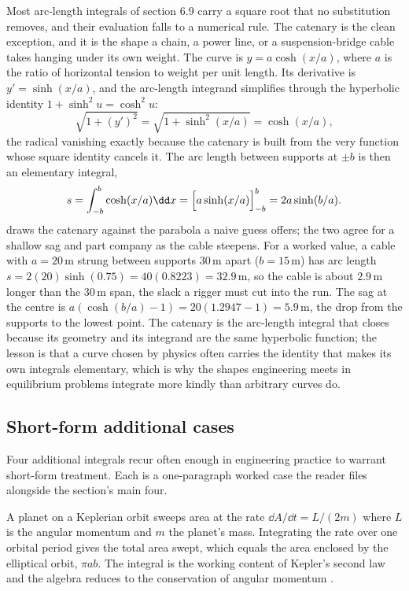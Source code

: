 Most arc-length integrals of section 6.9 carry a square root that no
substitution removes, and their evaluation falls to a numerical rule. The
catenary is the clean exception, and it is the shape a chain, a power
line, or a suspension-bridge cable takes hanging under its own weight. The
curve is $y = a\cosh(x/a)$, where $a$ is the ratio of horizontal tension
to weight per unit length. Its derivative is $y' = \sinh(x/a)$, and the
arc-length integrand simplifies through the hyperbolic identity $1 +
\sinh^{2}u = \cosh^{2}u$:
\[
\sqrt{1 + (y')^{2}} = \sqrt{1 + \sinh^{2}(x/a)} = \cosh(x/a),
\]
the radical vanishing exactly because the catenary is built from the very
function whose square identity cancels it. The arc length between supports
at $\pm b$ is then an elementary integral,
\[
s = \int_{-b}^{b}\cosh(x/a)\dd x = \Bigl[a\sinh(x/a)\Bigr]_{-b}^{b} =
2a\sinh(b/a).
\]
 draws the catenary against the
parabola a naive guess offers; the two agree for a shallow sag and part
company as the cable steepens. For a worked value, a cable with $a =
20\,\si{\meter}$ strung between supports $30\,\si{\meter}$ apart ($b =
15\,\si{\meter}$) has arc length $s = 2(20)\sinh(0.75) = 40(0.8223) =
32.9\,\si{\meter}$, so the cable is about $2.9\,\si{\meter}$ longer than
the $30\,\si{\meter}$ span, the slack a rigger must cut into the run. The
sag at the centre is $a(\cosh(b/a) - 1) = 20(1.2947 - 1) = 5.9\,
\si{\meter}$, the drop from the supports to the lowest point. The catenary
is the arc-length integral that closes because its geometry and its
integrand are the same hyperbolic function; the lesson is that a curve
chosen by physics often carries the identity that makes its own integrals
elementary, which is why the shapes engineering meets in equilibrium
problems integrate more kindly than arbitrary curves do.



\subsection{Short-form additional cases}

Four additional integrals recur often enough in engineering
practice to warrant short-form treatment. Each is a one-paragraph
worked case the reader files alongside the section's main four.

 A planet on a Keplerian
orbit sweeps area at the rate $\dd A / \dd t = L / (2m)$ where
$L$ is the angular momentum and $m$ the planet's mass. Integrating
the rate over one orbital period gives the total area swept,
which equals the area enclosed by the elliptical orbit, $\pi a b$.
The integral is the working content of Kepler's second law and
the algebra reduces to the conservation of angular momentum
\cite{text:v2ch06-apostol-calculus}.

